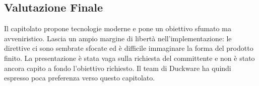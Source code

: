 \subsection{Valutazione Finale}
Il capitolato propone tecnologie moderne e pone un obiettivo sfumato ma avveniristico. Lascia un ampio margine di libertà nell'implementazione: le direttive ci sono sembrate sfocate ed è difficile immaginare la forma del prodotto finito. La presentazione è stata vaga sulla richiesta del committente e non è stato ancora capito a fondo l'obiettivo richiesto. Il team di Duckware ha quindi espresso poca preferenza verso questo capitolato.
